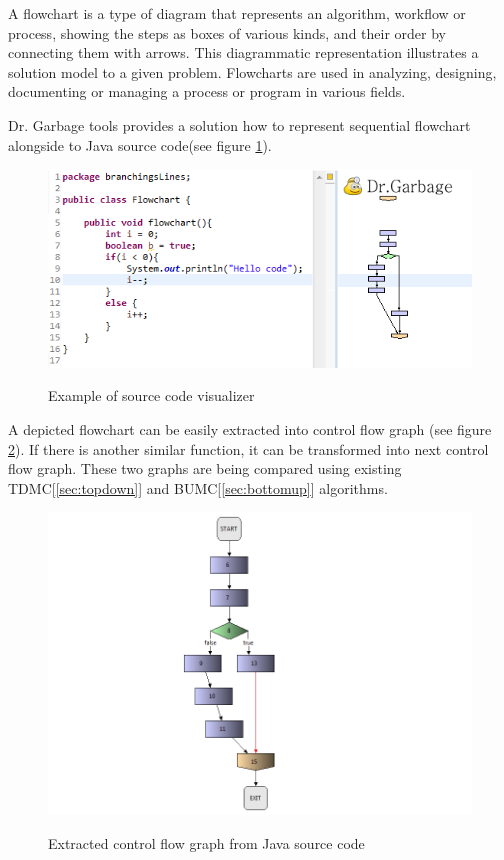 \documentclass{report}
\begin{document}
A flowchart is a type of diagram that represents an algorithm, workflow or process, showing the steps as boxes of various kinds, and their order by connecting them with arrows. This diagrammatic representation illustrates a solution model to a given problem. Flowcharts are used in analyzing, designing, documenting or managing a process or program in various fields\cite{wiki_flowchart}.

Dr. Garbage tools\cite{drgarbage} provides a solution how to represent sequential flowchart alongside to Java source code(see figure \ref{fig:java-flowchart-example}).
\begin{figure}[h]
  \centering
  \includegraphics[width=1.00\textwidth]{Figures/Java-flowchart-exp/java-flowchart-example.png}\\[0.1cm]
  \caption[Java sequential block diagram opened in Java Source code Visualizer]{Example of source code visualizer}
  \label{fig:java-flowchart-example}
\end{figure}

A depicted flowchart can be easily extracted into control flow graph (see figure \ref{fig:control-flow-graph}). If there is another similar function, it can be transformed into next control flow graph. These two graphs are being compared using existing TDMC[\ref{sec:topdown}] and BUMC[\ref{sec:bottomup}] algorithms. 

\begin{figure}
  \centering
  \includegraphics[width=1.00\textwidth]{Figures/Java-flowchart-exp/control-flow-graph.png}\\[0.1cm]
  \caption[Extracted control flow graph from Java source code]{Extracted control flow graph from Java source code}
  \label{fig:control-flow-graph}
\end{figure}
\end{document}
